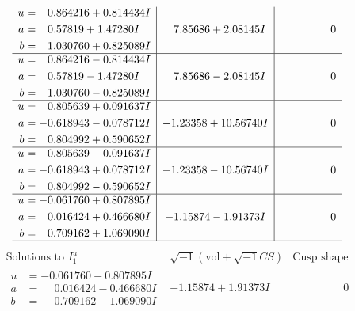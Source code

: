 \documentclass[1p]{elsarticle_modified}
\theoremstyle{definition}
\newcommand{\I}{\sqrt{-1}}
\begin{document}
$$\begin{array}{c|c|c}
\begin{aligned}
u &= \phantom{-}0.864216 + 0.814434 I \\
a &= \phantom{-}0.57819 + 1.47280 I \\
b &= \phantom{-}1.030760 + 0.825089 I\end{aligned}
 & \phantom{-}7.85686 + 2.08145 I & \phantom{-0.000000 } 0 \\ \hline\begin{aligned}
u &= \phantom{-}0.864216 - 0.814434 I \\
a &= \phantom{-}0.57819 - 1.47280 I \\
b &= \phantom{-}1.030760 - 0.825089 I\end{aligned}
 & \phantom{-}7.85686 - 2.08145 I & \phantom{-0.000000 } 0 \\ \hline\begin{aligned}
u &= \phantom{-}0.805639 + 0.091637 I \\
a &= -0.618943 - 0.078712 I \\
b &= \phantom{-}0.804992 + 0.590652 I\end{aligned}
 & -1.23358 + 10.56740 I & \phantom{-0.000000 } 0 \\ \hline\begin{aligned}
u &= \phantom{-}0.805639 - 0.091637 I \\
a &= -0.618943 + 0.078712 I \\
b &= \phantom{-}0.804992 - 0.590652 I\end{aligned}
 & -1.23358 - 10.56740 I & \phantom{-0.000000 } 0 \\ \hline\begin{aligned}
u &= -0.061760 + 0.807895 I \\
a &= \phantom{-}0.016424 + 0.466680 I \\
b &= \phantom{-}0.709162 + 1.069090 I\end{aligned}
 & -1.15874 - 1.91373 I & \phantom{-0.000000 } 0\\
 \hline 
 \end{array}$$\newpage$$\begin{array}{c|c|c}  
\text{Solutions to }I^u_{1}& \I (\text{vol} + \sqrt{-1}CS) & \text{Cusp shape}\\
 \hline 
\begin{aligned}
u &= -0.061760 - 0.807895 I \\
a &= \phantom{-}0.016424 - 0.466680 I \\
b &= \phantom{-}0.709162 - 1.069090 I\end{aligned}
 & -1.15874 + 1.91373 I & \phantom{-0.000000 } 0 \\ \hline\begin{aligned}

\end{aligned}
\end{array}$$
\end{document}
